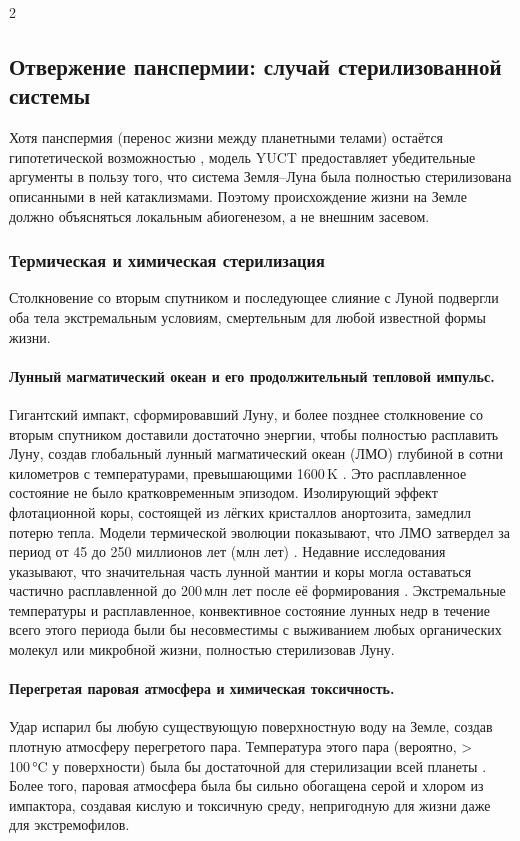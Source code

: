 \documentclass[11pt,a4paper]{article}
\begin{document}
	\begin{multicols}{2}
		
		\subsection{Отвержение панспермии: случай стерилизованной системы}
		
		Хотя панспермия (перенос жизни между планетными телами) остаётся гипотетической возможностью \cite{PanspermiaReview}, модель YUCT предоставляет убедительные аргументы в пользу того, что система Земля–Луна была полностью стерилизована описанными в ней катаклизмами. Поэтому происхождение жизни на Земле должно объясняться локальным абиогенезом, а не внешним засевом.
		
		\subsubsection{Термическая и химическая стерилизация}
		
		Столкновение со вторым спутником и последующее слияние с Луной подвергли оба тела экстремальным условиям, смертельным для любой известной формы жизни.
		
		\paragraph{Лунный магматический океан и его продолжительный тепловой импульс.}
		Гигантский импакт, сформировавший Луну, и более позднее столкновение со вторым спутником доставили достаточно энергии, чтобы полностью расплавить Луну, создав глобальный лунный магматический океан (ЛМО) глубиной в сотни километров с температурами, превышающими 1600 K \cite{Sahijpal2020}. Это расплавленное состояние не было кратковременным эпизодом. Изолирующий эффект флотационной коры, состоящей из лёгких кристаллов анортозита, замедлил потерю тепла. Модели термической эволюции показывают, что ЛМО затвердел за период от 45 до 250 миллионов лет (млн лет) \cite{Colin2024, Maurice2018}. Недавние исследования указывают, что значительная часть лунной мантии и коры могла оставаться частично расплавленной до 200 млн лет после её формирования \cite{Maurice2020}. Экстремальные температуры и расплавленное, конвективное состояние лунных недр в течение всего этого периода были бы несовместимы с выживанием любых органических молекул или микробной жизни, полностью стерилизовав Луну.
		
		\paragraph{Перегретая паровая атмосфера и химическая токсичность.}
		Удар испарил бы любую существующую поверхностную воду на Земле, создав плотную атмосферу перегретого пара. Температура этого пара (вероятно, > 100 °C у поверхности) была бы достаточной для стерилизации всей планеты \cite{Zahnle2015}. Более того, паровая атмосфера была бы сильно обогащена серой и хлором из импактора, создавая кислую и токсичную среду, непригодную для жизни даже для экстремофилов.
		

\end{multicols}
\end{document}
